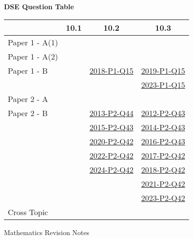 \documentclass[12pt, a4paper]{article}
\begin{document}
\begin{absolutelynopagebreak}
\begin{center}
\textbf{DSE Question Table}
\end{center}
\begin{center}
\begin{tabular}{|l|c|c|c|}
\hline
        & 10.1 & 10.2 & 10.3 \\\hline
\hline
Paper 1 - A(1)&  &  &  \\
\hline
Paper 1 - A(2)&  &  &  \\
\hline
Paper 1 - B&  & \hyperref[DSE2018-CoreP1-Q15]{2018-P1-Q15} & \hyperref[DSE2019-CoreP1-Q15]{2019-P1-Q15} \\
&  &  & \hyperref[DSE2023-CoreP1-Q15]{2023-P1-Q15} \\
\hline
\hline
Paper 2 - A&  &  &  \\
\hline
Paper 2 - B&  & \hyperref[DSE2013-CoreP2-Q44]{2013-P2-Q44} & \hyperref[DSE2012-CoreP2-Q43]{2012-P2-Q43} \\
&  & \hyperref[DSE2015-CoreP2-Q43]{2015-P2-Q43} & \hyperref[DSE2014-CoreP2-Q43]{2014-P2-Q43} \\
&  & \hyperref[DSE2020-CoreP2-Q42]{2020-P2-Q42} & \hyperref[DSE2016-CoreP2-Q43]{2016-P2-Q43} \\
&  & \hyperref[DSE2022-CoreP2-Q42]{2022-P2-Q42} & \hyperref[DSE2017-CoreP2-Q42]{2017-P2-Q42} \\
&  & \hyperref[DSE2024-CoreP2-Q42]{2024-P2-Q42} & \hyperref[DSE2018-CoreP2-Q42]{2018-P2-Q42} \\
&  &  & \hyperref[DSE2021-CoreP2-Q42]{2021-P2-Q42} \\
&  &  & \hyperref[DSE2023-CoreP2-Q42]{2023-P2-Q42} \\
\hline
\hline
Cross Topic&  &  &  \\
\hline
\end{tabular}
\end{center}
\end{absolutelynopagebreak}
\newpage
\newpage
\thispagestyle{empty}
\begin{center}
Mathematics Revision Notes\\\vspace{1cm}
\\\vspace{1cm}
{\fontsize{24pt}{24pt}\selectfont {More about Probability \NF}} \\\vspace{1cm}
\label{chapter:S5-11}

\end{center}
\vspace{0.5cm}
\hline
\end{document}
